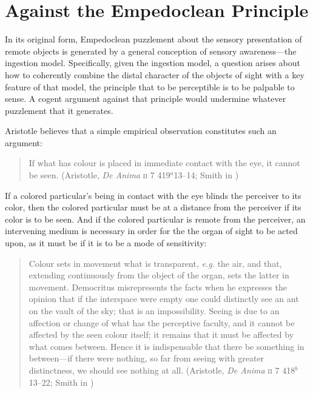 

\section{Against the Empedoclean Principle} %
\label{sec:against_the_empedoclean_principle}

In its original form, Empedoclean puzzlement about the sensory presentation of remote objects is generated by a general conception of sensory awareness---the ingestion model. Specifically, given the ingestion model, a question arises about how to coherently combine the distal character of the objects of sight with a key feature of that model, the principle that to be perceptible is to be palpable to sense. A cogent argument against that principle would undermine whatever puzzlement that it generates. 

Aristotle believes that a simple empirical observation constitutes such an argument:
\begin{quote}
	If what has colour is placed in immediate contact with the eye, it cannot be seen. (Aristotle, \emph{De Anima} \textsc{ii} 7 419\( ^{a} \)13--14; Smith in \citealt[]{Barnes:1984uq})
\end{quote}
If a colored particular's being in contact with the eye blinds the perceiver to its color, then the colored particular must be at a distance from the perceiver if its color is to be seen. And if the colored particular is remote from the perceiver, an intervening medium is necessary in order for the the organ of sight to be acted upon, as it must be if it is to be a mode of sensitivity:
\begin{quote}
	Colour sets in movement what is transparent, \emph{e.g.} the air, and that, extending continuously from the object of the organ, sets the latter in movement. Democritus misrepresents the facts when he expresses the opinion that if the interspace were empty one could distinctly see an ant on the vault of the sky; that is an impossibility. Seeing is due to an affection or change of what has the perceptive faculty, and it cannot be affected by the seen colour itself; it remains that it must be affected by what comes between. Hence it is indispensable that there be something in between---if there were nothing, so far from seeing with greater distinctness, we should see nothing at all. (Aristotle, \emph{De Anima} \textsc{ii} 7 418\( ^{b} \)13--22; Smith in \citealt[33--34]{Barnes:1984uq})
\end{quote}

